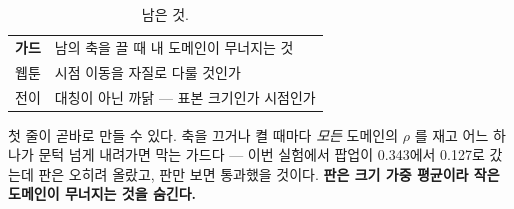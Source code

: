 \documentclass[10pt]{article}
\begin{document}
\begin{table}[t]
\centering\tsize
\caption{남은 것.}
\begin{tabular}{ll}
\toprule
\textbf{가드} & 남의 축을 끌 때 내 도메인이 무너지는 것 \\
웹툰 & 시점 이동을 자질로 다룰 것인가 \\
전이 & 대칭이 아닌 까닭 --- 표본 크기인가 시점인가 \\
\bottomrule
\end{tabular}
\end{table}

첫 줄이 곧바로 만들 수 있다. 축을 끄거나 켤 때마다 \emph{모든} 도메인의
$\rho$ 를 재고 어느 하나가 문턱 넘게 내려가면 막는 가드다 --- 이번 실험에서
팝업이 0.343에서 0.127로 갔는데 판은 오히려 올랐고, 판만 보면 통과했을
것이다. \textbf{판은 크기 가중 평균이라 작은 도메인이 무너지는 것을 숨긴다.}
\end{document}
